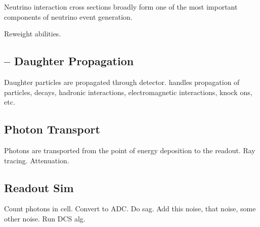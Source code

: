 Neutrino interaction cross sections broadly form one of the most important components of neutrino event generation.

Reweight abilities.

\subsection{\geant -- Daughter Propagation}

Daughter particles are propagated through detector.  \geant handles propagation of particles, decays, hadronic interactions, electromagnetic interactions, knock ons, etc.

\subsection{Photon Transport}

Photons are transported from the point of energy deposition to the  readout.  Ray tracing.  Attenuation.


\subsection{Readout Sim}

Count photons in cell.  Convert to ADC.  Do sag.  Add this noise, that noise, some other noise.  Run DCS alg.




